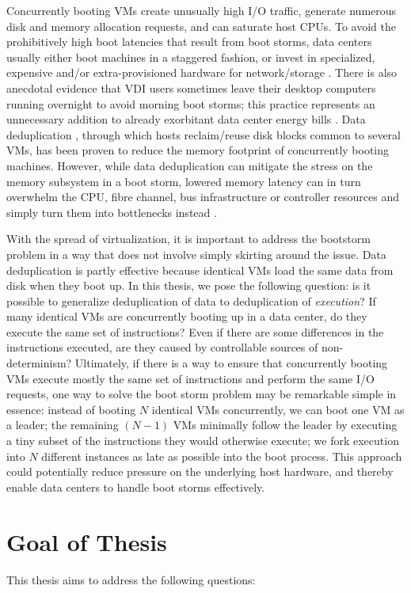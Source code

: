 Concurrently booting VMs create unusually high I/O traffic,
generate numerous disk and memory allocation requests,
and can saturate host CPUs. 
To avoid the prohibitively high boot latencies that  
result from boot storms, data centers usually either 
boot machines in a staggered fashion, or invest in specialized,
expensive and/or extra-provisioned hardware for network/storage \cite{highperfnas, liao2011vmstore}.
There is also anecdotal evidence that VDI users sometimes leave their desktop computers running
overnight to avoid morning boot storms; this practice
represents an unnecessary addition to already exorbitant
data center energy bills \cite{qureshi2009bills}. Data deduplication \cite{clements2009deduplication},
through which hosts reclaim/reuse disk blocks common to several VMs, 
has been proven to reduce the memory footprint of concurrently
booting machines. However, while data deduplication can mitigate the stress on the memory subsystem in
a boot storm, lowered memory latency can in turn overwhelm the CPU, 
fibre channel, bus infrastructure or controller resources 
and simply turn them into bottlenecks instead \cite{netappstorm}. 

With the spread of virtualization, it is important to address the
bootstorm problem in a way that does not involve simply skirting around the
issue. Data deduplication is partly effective because identical VMs load
the same data from disk when they boot up. In this thesis, we pose the following question: 
is it possible to generalize deduplication of data to deduplication of \emph{execution}?
If many identical VMs are concurrently booting up in a data center, 
do they execute the same set of instructions? Even if there are
some differences in the instructions executed, are they caused by
controllable sources of non-determinism? Ultimately, if there is a way
to ensure that concurrently booting VMs execute mostly the same set of instructions
and perform the same I/O requests, one way to solve the boot storm
problem may be remarkable simple in essence: instead of booting
$N$ identical VMs concurrently, we can boot one VM as a leader; the remaining $(N-1)$ VMs minimally
follow the leader by executing a tiny subset of the instructions they would otherwise execute;
we fork execution into $N$ different instances as late as possible into the boot process. This approach
could potentially reduce pressure on the underlying host hardware,
and thereby enable data centers to handle boot storms effectively.

\section{Goal of Thesis}
This thesis aims to address the following questions:

